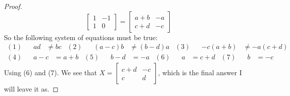 \documentclass[12pt]{article}
\begin{document}
\begin{enumerate}
\begin{enumerate}
\begin{proof}
\[\begin{bmatrix}
					1 & -1 \\
					1 & 0
				\end{bmatrix} = \begin{bmatrix}
					a+b & -a \\
					c+d & -c
				\end{bmatrix}\]
				So the following system of equations must be true:
				\begin{align*}
					(1)&&ad &\neq bc & (2)&&(a-c)b &\neq (b-d)a & (3)&&-c(a+b) &\neq -a(c+d)
				\end{align*}
				\begin{align*}
					(4)&&a-c &= a+b & (5)&&b-d &= -a & (6)&&a  &= c+d & (7)&&b  &= -c 
				\end{align*}
				Using (6) and (7). We see that $X = \begin{bmatrix}
					c+d & -c\\
					c & d
				\end{bmatrix}$, which is the final answer I will leave it as.
			\end{proof}
		\end{enumerate}	
	

\end{enumerate}
\end{document}
